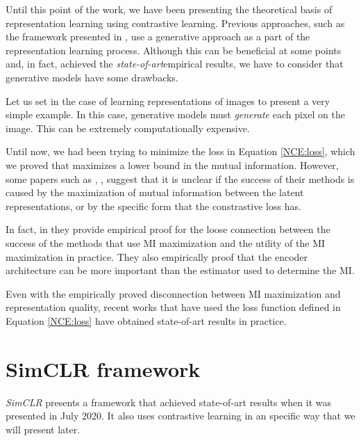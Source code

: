\label{Chapter:SimCLR}

Until this point of the work, we have been presenting the theoretical basis of representation learning using contrastive learning. Previous approaches, such as  the framework presented in \cite{oord_representation_2019}, use a generative approach as a part of the representation learning process. Although this can be beneficial at some points and, in fact, achieved the \emph{state-of-art}\footnotemark empirical results, we have to consider that generative models have some drawbacks. 



Let us set in the case of learning representations of images to present a very simple example. In this case, generative models must \emph{generate} each pixel on the image. This can be extremely computationally expensive. 

Until now, we had been trying to minimize the loss in Equation \eqref{NCE:loss}, which we proved that maximizes a lower bound in the mutual information. However, some papers such as \cite{chen_simple_2020}, \cite{tschannen_mutual_2020}, suggest that it is unclear if the success of their methods is caused by the maximization of mutual information between the latent representations, or by the specific form that the constrastive loss has.

In fact, in \cite{tschannen_mutual_2020} they provide empirical proof for the loose connection between the success of the methods that use MI maximization and the utility of the MI maximization in practice. They also empirically proof  that the encoder architecture can be more important than the estimator used to determine the MI.

Even with the empirically proved disconnection between MI maximization and representation quality, recent works that have used the loss function defined in Equation \eqref{NCE:loss} have obtained state-of-art results in practice. 


\section{SimCLR framework}

\emph{SimCLR} \citep{chen_simple_2020} presents a framework that achieved state-of-art results when it was presented in July 2020. It also uses contrastive learning in an specific way that we will present later. 

